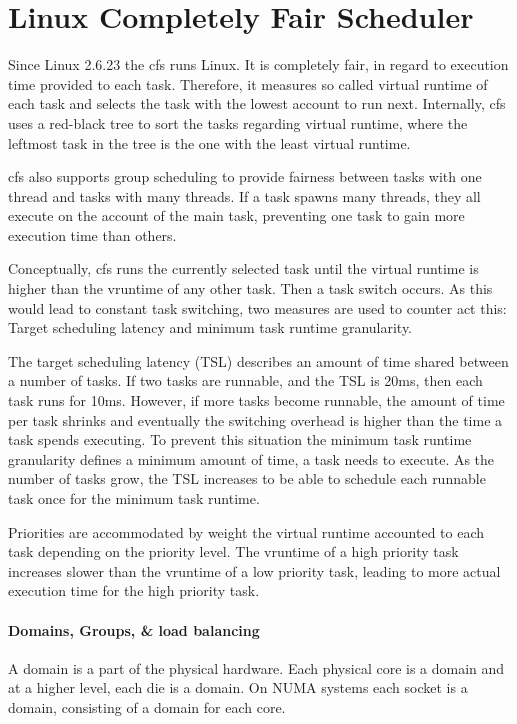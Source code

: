 \section{Linux Completely Fair Scheduler}
\label{state:cfs}


Since Linux 2.6.23 the \gls{cfs} runs Linux.
It is completely fair, in regard to execution time provided to each task.
Therefore, it measures so called virtual runtime of each task and selects the
task with the lowest account to run next.
Internally, \gls{cfs} uses a red-black tree to sort the tasks regarding virtual
runtime, where the leftmost task in the tree is the one with the least virtual
runtime.

\gls{cfs} also supports group scheduling to provide fairness between tasks with one
thread and tasks with many threads.
If a task spawns many threads, they all execute on the account of the main
task, preventing one task to gain more execution time than others.

Conceptually, \gls{cfs} runs the currently selected task until the virtual runtime is
higher than the vruntime of any other task.
Then a task switch occurs.
As this would lead to constant task switching, two measures are used to counter
act this: Target scheduling latency and minimum task runtime granularity.

The target scheduling latency (TSL) describes an amount of time shared between a
number of tasks.
If two tasks are runnable, and the TSL is 20ms, then each task runs for 10ms.
However, if more tasks become runnable, the amount of time per task shrinks and
eventually the switching overhead is higher than the time a task spends
executing.
To prevent this situation the minimum task runtime granularity defines a
minimum amount of time, a task needs to execute.
As the number of tasks grow, the TSL increases to be able to schedule each
runnable task once for the minimum task runtime.

Priorities are accommodated by weight the virtual runtime accounted to each
task depending on the priority level.
The vruntime of a high priority task increases slower than the vruntime of a
low priority task, leading to more actual execution time for the high priority
task.

\paragraph{Domains, Groups, \& load balancing}
A domain is a part of the physical hardware.
Each physical core is a domain and at a higher level, each die is a domain.
On NUMA systems each socket is a domain, consisting of a domain for each core.

